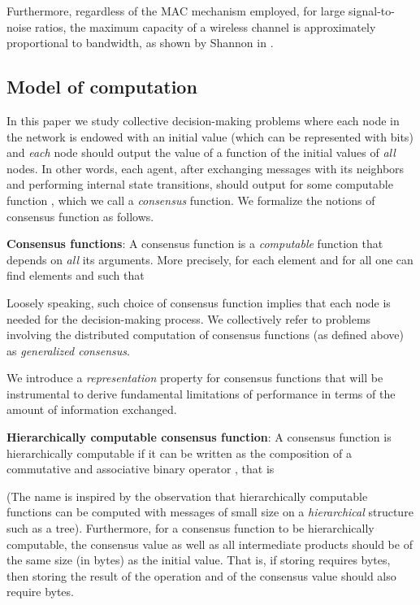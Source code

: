 \documentclass[letterpaper,10pt,conference]{ieeeconf}
\begin{document}
Furthermore, regardless of the MAC mechanism employed, for large signal-to-noise ratios, the maximum capacity of a wireless channel is approximately proportional to bandwidth, as shown by Shannon in \cite{CES:49}.

\subsection{Model of computation}

In this paper we study collective decision-making problems where each node in the network is endowed with an initial value  (which can be represented with  bits) and \emph{each} node should output the value of a function of the initial values of \emph{all} nodes. In other words, each agent, after exchanging messages with its neighbors and performing internal state transitions, should output  for some computable function , which we call a \emph{consensus} function.
 We formalize the notions of consensus function as follows.

\textbf{Consensus functions}:
A consensus function is a \emph{computable} function  that depends on \emph{all} its arguments. More precisely, for each element  and for all  one can find elements  and  such that

Loosely speaking, such choice of consensus function implies that each node is needed for the decision-making process. We collectively refer to problems involving the distributed computation of consensus functions (as defined above) as \emph{generalized consensus}. 

We introduce a \emph{representation} property for consensus functions that will be instrumental to derive fundamental limitations of performance in terms of the amount of information exchanged.

\textbf{Hierarchically computable consensus function}:
A consensus function is hierarchically computable if it can be written as  the composition of  a commutative and associative binary operator , that is

(The name is inspired by the observation that hierarchically computable functions can be computed with messages of small size on a \emph{hierarchical} structure such as a  tree). Furthermore, for a consensus function to be hierarchically computable, the consensus value as well as all intermediate products should be of the same size (in bytes) as the initial value. That is, if storing  requires  bytes, then storing the result of the operation  and of the consensus value  should also require  bytes.
\end{document}
